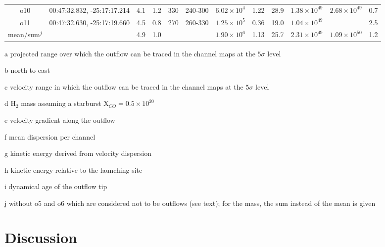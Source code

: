 \begin{table}
\begin{threeparttable}
\begin{tabular}{cccccccccccc}
	    o10 & 00:47:32.832, -25:17:17.214 & 4.1  & 1.2 & 330 & 240-300 & $6.02 \times 10^4$ & 1.22  & 28.9 & $1.38 \times 10^{49}$ & $2.68 \times 10^{49}$ & 0.7\\
	    o11 & 00:47:32.630, -25:17:19.660 & 4.5  & 0.8 & 270 & 260-330 & $1.25 \times 10^5$ & 0.36  & 19.0 & $1.04 \times 10^{49}$ & & 2.5\\
	    \midrule
	    mean/sum$^j$ &                    & 4.9  & 1.0 &     &         & $1.90 \times 10^6$ & 1.13  & 25.7 & $2.31 \times 10^{49}$ & $1.09 \times 10^{50}$ & 1.2\\
        \bottomrule
    \end{tabular}
    \vspace{0.5em}
	\begin{tablenotes}
		\item[a] projected range over which the outflow can be traced in the channel maps at the $5 \sigma$ level
		\item[b] north to east
		\item[c] velocity range in which the outflow can be traced in the channel maps at the $5 \sigma$ level
		\item[d] H$_2$ mass assuming a starburst $\mathrm{X}_{CO} = 0.5 \times 10^{20}$\,\sqcm
		\item[e] velocity gradient along the outflow
		\item[f] mean dispersion per channel
		\item[g] kinetic energy derived from velocity dispersion
		\item[h] kinetic energy relative to the launching site
		\item[i] dynamical age of the outflow tip
		\item[j] without o5 and o6 which are considered not to be outflows (see text); for the mass, the sum instead of the mean is given
	\end{tablenotes}
	\end{threeparttable}
\end{table}


\section{Discussion}

